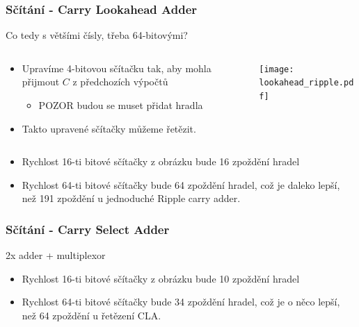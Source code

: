 \documentclass{beamer}
\begin{document}
\begin{frame}
\frametitle{Sčítání - Carry Lookahead Adder}

Co tedy s většími čísly, třeba 64-bitovými?

\begin{columns}
\begin{column}{0.45\textwidth}
\begin{itemize}
\item Upravíme 4-bitovou sčítačku tak, aby mohla přijmout $C$ z předchozích výpočtů
\begin{itemize}
\item POZOR budou se muset přidat hradla
\end{itemize}
\item Takto upravené sčítačky můžeme řetězit.
\end{itemize}
\end{column}
\begin{column}{0.55\textwidth}
\begin{center}
   \texttt{[image: lookahead\_ripple.pdf]}
\end{center}
\end{column}
\end{columns}


\begin{itemize}
\item Rychlost 16-ti bitové sčítačky z obrázku bude 16 zpoždění hradel
\item Rychlost 64-ti bitové sčítačky bude 64 zpoždění hradel, což je daleko lepší, než 191 zpoždění u jednoduché Ripple carry adder.
\end{itemize}

\end{frame}


\begin{frame}
\frametitle{Sčítání - Carry Select Adder}

2x adder + multiplexor

\begin{itemize}
\item Rychlost 16-ti bitové sčítačky z obrázku bude 10 zpoždění hradel
\item Rychlost 64-ti bitové sčítačky bude 34 zpoždění hradel, což je o něco lepší, než 64 zpoždění u řetězení CLA.
\end{itemize}

\end{frame}
\end{document}
